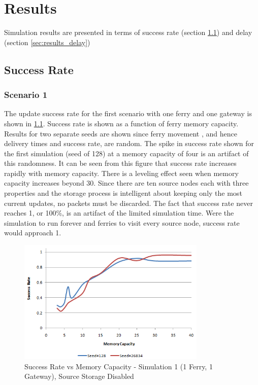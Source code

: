 \chapter{Results}

Simulation results are presented in terms of success rate (section \ref{sec:results_success_rate}) and delay (section \ref{sec:results_delay}) 

\section{Success Rate}
\label{sec:results_success_rate}

\subsection{Scenario 1}
\label{sec:results_success_scenario1}

The update success rate for the first scenario with one ferry and one gateway is shown in \ref{fig:result_sccess_sim1byseed_dss}.
Success rate is shown as a function of ferry memory capacity. 
Results for two separate seeds are shown since ferry movement , and hence delivery times and success rate, are random.
The spike in success rate shown for the first simulation (seed of 128) at a memory capacity of four is an artifact of this randomness.
It can be seen from this figure that success rate increases rapidly with memory capacity.
There is a leveling effect seen when memory capacity increases beyond 30.
Since there are ten source nodes each with three properties and the storage process is intelligent about keeping only the most current updates, no packets must be discarded.
The fact that success rate never reaches 1, or 100\%, is an artifact of the limited simulation time.
Were the simulation to run forever and ferries to visit every source node, success rate would approach 1.

\begin{figure}[htbp]
    \begin{center}
    \includegraphics[width=0.8\textwidth]{images/result_sccess_sim1byseed_dss}
    \caption{Success Rate vs Memory Capacity - Simulation 1 (1 Ferry, 1 Gateway), Source Storage Disabled}
    \label{fig:result_sccess_sim1byseed_dss}
    \end{center}
\end{figure}

